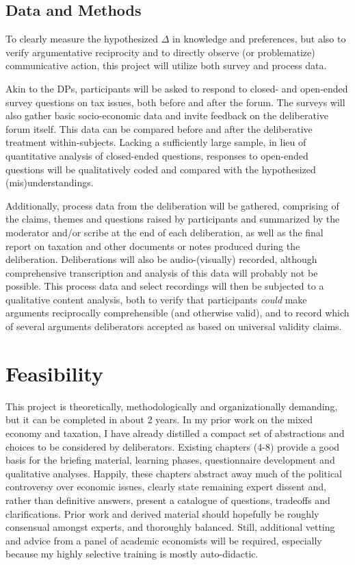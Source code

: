 \subsection{Data and Methods}
To clearly measure the hypothesized $\Delta$ in knowledge and preferences, but also to verify argumentative reciprocity and to directly observe (or problematize) communicative action, this project will utilize both survey and process data.

Akin to the \gls{DP}s, participants will be asked to respond to closed- and open-ended survey questions on tax issues, both before and after the forum.
The surveys will also gather basic socio-economic data and invite feedback on the deliberative forum itself.
This data can be compared before and after the deliberative treatment within-subjects.
Lacking a sufficiently large sample, in lieu of quantitative analysis of closed-ended questions, responses to open-ended questions will be qualitatively coded and compared with the hypothesized (mis)understandings.

Additionally, process data from the deliberation will be gathered, comprising of the claims, themes and questions raised by participants and summarized by the moderator and/or scribe at the end of each deliberation, as well as the final report on taxation and other documents or notes produced during the deliberation.
Deliberations will also be audio-(visually) recorded, although comprehensive transcription and analysis of this data will probably not be possible.
This process data and select recordings will then be subjected to a qualitative content analysis, both to verify that participants \emph{could} make arguments reciprocally comprehensible (and otherwise valid), and to record which of several arguments deliberators accepted as based on universal validity claims.

\section{Feasibility}
This project is theoretically, methodologically and organizationally demanding, but it can be completed in about 2 years.
In my prior work on the mixed economy and taxation, I have already distilled a compact set of abstractions and choices to be considered by deliberators.
Existing chapters (4-8) provide a good basis for the briefing material, learning phases, questionnaire development and qualitative analyses.
Happily, these chapters abstract away much of the political controversy over economic issues, clearly state remaining expert dissent and, rather than definitive answers, present a catalogue of questions, tradeoffs and clarifications.
Prior work and derived material should hopefully be roughly consensual amongst experts, and thoroughly balanced.
Still, additional vetting and advice from a panel of academic economists will be required, especially because my highly selective training is mostly auto-didactic.

